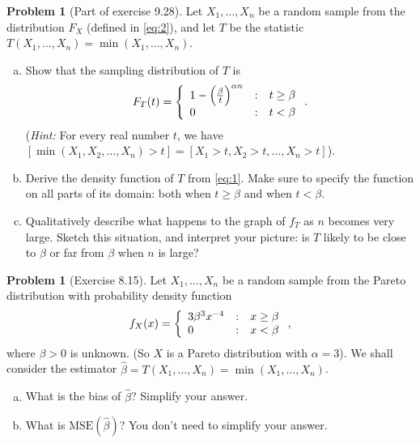 \documentclass[10pt]{article}
\theoremstyle{definition}
\newtheorem{problem}[theorem]{Problem}
\newcommand{\1}[1]{\textbf{1}_{\left[#1\right]}} %
\begin{document}
\begin{problem}[Part of exercise 9.28]
  Let $X_{1},\ldots,X_{n}$ be a random sample from the distribution $F_{X}$ (defined in \cref{eq:2}), and let
  $T$ be the statistic $T(X_{1},\ldots,X_{n})=\min(X_{1},\ldots,X_{n})$.
  \begin{enumerate}[(a)]
    \item  Show that the sampling distribution of $T$ is
    \begin{equation}\label{eq:1}
      F_{T}(t) = \left\{ \begin{array}{l@{\quad:\quad}l} 
          1- \left( \frac{\beta}{t} \right)^{\alpha n} & t \geq \beta \\
          0 &t < \beta \end{array}\right..
    \end{equation}
    (\textit{Hint:} For every real number $t$, we have
    $\left[ \min(X_{1},X_{2},\ldots,X_{n}) > t\right] = \left[ X_{1}> t,
      X_{2}> t,\ldots, X_{n}> t\right]$).
    \item Derive the density function of $T$ from \cref{eq:1}. Make sure to
    specify the function on all parts of its domain: both when $t \geq \beta$
    and when $t<\beta$.
    \item Qualitatively describe what happens to the graph of $f_{T}$ as $n$
    becomes very large. Sketch this situation, and interpret your picture: is
    $T$ likely to be close to $\beta$ or far from $\beta$ when $n$ is large?
  \end{enumerate}
\end{problem}

\begin{problem}[Exercise 8.15]
  Let $X_{1},\ldots,X_{n}$ be a random sample from the Pareto distribution
  with probability density function
  \begin{equation*}
    f_{X}(x) = \left\{ \begin{array}{l@{\quad:\quad}l} 3\beta^{3}x^{-4} &  x \geq \beta
        \\ 0& x<\beta\end{array}\right.,
  \end{equation*}
  where $\beta>0$ is unknown. (So $X$ is a Pareto distribution with
  $\alpha=3$). We shall consider the estimator
  $\widehat{\beta}=T(X_{1},\ldots,X_{n})=\min(X_{1},\ldots,X_{n})$.
  \begin{enumerate}[(a)]
    \item What is the bias of $\widehat{\beta}$? Simplify your answer.
    \item What is $\text{MSE}(\widehat{\beta})$? You don't need to simplify
    your answer.
  \end{enumerate}
\end{problem}
\end{document}
